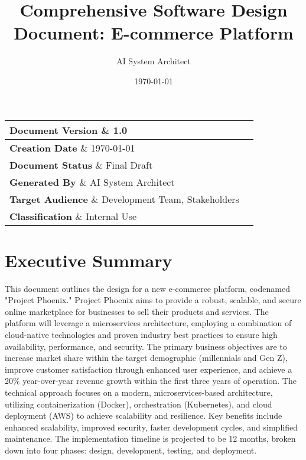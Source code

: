 \documentclass[11pt,a4paper,oneside]{article}
\title{\Huge\textbf{Comprehensive Software Design Document: E-commerce Platform}}
\author{\Large AI System Architect}
\date{\Large\today}
\begin{document}
\maketitle
\thispagestyle{empty}
\vfill

\begin{center}
\large
\begin{tabular}{|l|l|}
\hline
\textbf{Document Version} \& 1.0 \\
\hline
\textbf{Creation Date} \& \today \\
\hline
\textbf{Document Status} \& Final Draft \\
\hline
\textbf{Generated By} \& AI System Architect \\
\hline
\textbf{Target Audience} \& Development Team, Stakeholders \\
\hline
\textbf{Classification} \& Internal Use \\
\hline
\end{tabular}
\end{center}

\newpage
\tableofcontents
\newpage
\listoffigures
\newpage

\section{Executive Summary}

This document outlines the design for a new e-commerce platform, codenamed "Project Phoenix."  Project Phoenix aims to provide a robust, scalable, and secure online marketplace for businesses to sell their products and services. The platform will leverage a microservices architecture, employing a combination of cloud-native technologies and proven industry best practices to ensure high availability, performance, and security.  The primary business objectives are to increase market share within the target demographic (millennials and Gen Z), improve customer satisfaction through enhanced user experience, and achieve a 20\% year-over-year revenue growth within the first three years of operation.  The technical approach focuses on a modern, microservices-based architecture, utilizing containerization (Docker), orchestration (Kubernetes), and cloud deployment (AWS) to achieve scalability and resilience.  Key benefits include enhanced scalability, improved security, faster development cycles, and simplified maintenance. The implementation timeline is projected to be 12 months, broken down into four phases: design, development, testing, and deployment.
\end{document}
